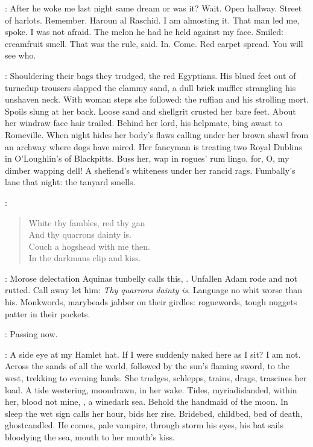 \StephenInt:
After he woke me last night same dream or was it?
Wait.
Open hallway.
Street of harlots.
Remember.
Haroun al Raschid.
I am almosting it.
That man led me, spoke.
I was not afraid.
The melon he had he held against my face.
Smiled:
creamfruit smell.
That was the rule, said.
In.
Come.
Red carpet spread.
You will see who.

:
Shouldering their bags they trudged, the red Egyptians.
His blued feet out of turnedup trousers
slapped the clammy sand,
a dull brick muffler strangling his unshaven neck.
With woman steps she followed:
the ruffian and his strolling mort.
Spoils slung at her back.
Loose sand and shellgrit crusted her bare feet.
About her windraw face hair trailed.
Behind her lord, his helpmate, bing awast to Romeville.
When night hides her body's flaws
calling under her brown shawl from an archway where dogs have mired.
Her fancyman is treating two Royal Dublins in O'Loughlin's of Blackpitts.
Buss her, wap in rogues' rum lingo,
for, O, my dimber wapping dell!
A shefiend's whiteness under her rancid rags.
Fumbally's lane that night:
the tanyard smells.

:
\begin{verse}
    White thy fambles, red thy gan \\
    And thy quarrons dainty is. \\
    Couch a hogshead with me then. \\
    In the darkmans clip and kiss.
\end{verse}

\StephenInt:
Morose delectation Aquinas tunbelly calls this, .
Unfallen Adam rode and not rutted.
Call away let him:
\emph{Thy quarrons dainty is}.
Language no whit worse than his.
Monkwords, marybeads jabber on their girdles:
roguewords, tough nuggets patter in their pockets.

\StephenInt:
Passing now.

\StephenInt:
A side eye at my Hamlet hat.
If I were suddenly naked here as I sit?
I am not.
Across the sands of all the world,
followed by the sun's flaming sword,
to the west, trekking to evening lands.
She trudges, schlepps,
trains, drags, trascines her load.
A tide westering, moondrawn, in her wake.
Tides, myriadislanded, within her,
blood not mine,
,
a winedark sea.
Behold the handmaid of the moon.
In sleep the wet sign calls her hour, bids her rise.
Bridebed, childbed,
bed of death,
ghostcandled.
He comes, pale vampire, through storm
his eyes, his bat sails bloodying the sea,
mouth to her mouth's kiss.

